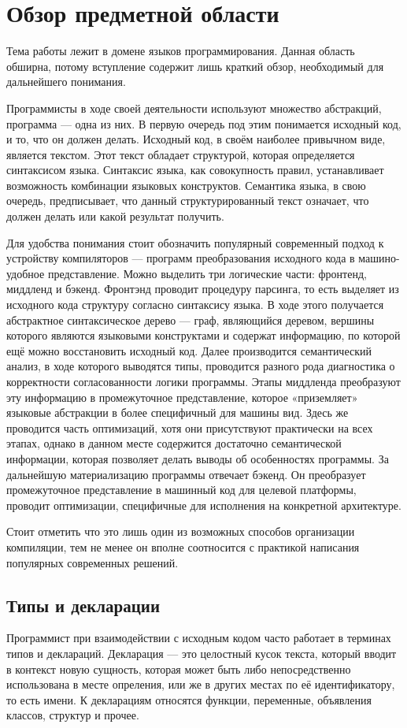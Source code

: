 \documentclass[times]{itmo-student-thesis}
\begin{document}
	\chapter{Обзор предметной области}
	
	Тема работы лежит в домене языков программирования. Данная область обширна, потому вступление содержит лишь краткий обзор, необходимый для дальнейшего понимания.
	
	Программисты в ходе своей деятельности используют множество абстракций, программа --- одна из них. В первую очередь под этим понимается исходный код, и то, что он должен делать. Исходный код, в своём наиболее привычном виде, является текстом. Этот текст обладает структурой, которая определяется синтаксисом языка. Синтаксис языка, как совокупность правил, устанавливает возможность комбинации языковых конструктов. Семантика языка, в свою очередь, предписывает, что данный структурированный текст означает, что должен делать или какой результат получить.
	
	Для удобства понимания стоит обозначить популярный современный подход к устройству компиляторов --- программ преобразования исходного кода в машино-удобное представление. Можно выделить три логические части: фронтенд, миддленд и бэкенд. Фронтэнд проводит процедуру парсинга, то есть выделяет из исходного кода структуру согласно синтаксису языка. В ходе этого получается абстрактное синтаксическое дерево --- граф, являющийся деревом, вершины которого являются языковыми конструктами и содержат информацию, по которой ещё можно восстановить исходный код. Далее производится семантический анализ, в ходе которого выводятся типы, проводится разного рода диагностика о корректности согласованности логики программы. Этапы миддленда преобразуют эту информацию в промежуточное представление, которое «приземляет» языковые абстракции в более специфичный для машины вид. Здесь же проводится часть оптимизаций, хотя они присутствуют практически на всех этапах, однако в данном месте содержится достаточно семантической информации, которая позволяет делать выводы об особенностях программы. За дальнейшую материализацию программы отвечает бэкенд. Он преобразует промежуточное представление в машинный код для целевой платформы, проводит оптимизации, специфичные для исполнения на конкретной архитектуре.
	
	Стоит отметить что это лишь один из возможных способов организации компиляции, тем не менее он вполне соотносится с практикой написания популярных современных решений.
	
	\section{Типы и декларации}
	Программист при взаимодействии с исходным кодом часто работает в терминах типов и деклараций. Декларация --- это целостный кусок текста, который вводит в контекст новую сущность, которая может быть либо непосредственно использована в месте опреления, или же в других местах по её идентификатору, то есть имени. К декларациям относятся функции, переменные, объявления классов, структур и прочее.
	
\end{document}
